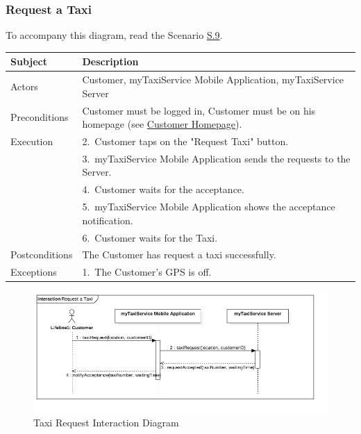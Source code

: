 \subsubsection{Request a Taxi}
			To accompany this diagram, read the Scenario \hyperref[sec:TaxiRequiringScenario]{S.9}.

				\begin{table}[htpb]
					\centering
					\label{tab:TaxiRequestTable}
					\begin{tabularx}{\textwidth}{lp{9cm}}
						\hline
						\hline
							\textbf{Subject}
						& 
							\textbf{Description}\\
						\hline
							Actors	       &  Customer, myTaxiService Mobile Application, myTaxiService Server\\
						\hline
							Preconditions  &  Customer must be logged in, Customer must be on his homepage (see \hyperref[chome_m]{Customer Homepage}).\\
						\hline
							Execution      &  2.~Customer taps on the "Request Taxi" button.\\
										   &  3.~myTaxiService Mobile Application sends the requests to the Server.\\
										   &  4.~Customer waits for the acceptance.\\
										   &  5.~myTaxiService Mobile Application shows the acceptance notification.\\
										   &  6.~Customer waits for the Taxi.\\
						\hline
							Postconditions &  The Customer has request a taxi successfully.\\
						\hline
							Exceptions     &  1.~The Customer's GPS is off.\\
									
						\hline
						\hline
					\end{tabularx}
				\end{table}
				
				\begin{figure}[H]
					\centering
					\includegraphics[width=\textwidth, scale=0.5]{IMG/InteractionDiagrams/TaxiRequest.png}
					\caption{Taxi Request Interaction Diagram}\label{sec:FigureTaxiRequest}
				\end{figure}